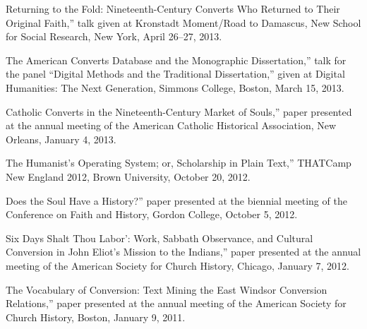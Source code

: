 \documentclass[11pt]{article}
\begin{document}
\noindent{}Returning to the Fold: Nineteenth-Century Converts Who Returned to Their Original Faith,'' talk given at Kronstadt Moment/Road to Damascus, New School for Social Research, New York, April 26--27, 2013.

\noindent{}The American Converts Database and the Monographic Dissertation,'' talk for the panel ``Digital Methods and the Traditional Dissertation,'' given at Digital Humanities: The Next Generation, Simmons College, Boston, March 15, 2013.

\noindent{}Catholic Converts in the Nineteenth-Century Market of Souls,'' paper presented at the annual meeting of the American Catholic Historical Association, New Orleans, January 4, 2013.

\noindent{}The Humanist's Operating System; or, Scholarship in Plain Text,'' THATCamp New England 2012, Brown University, October 20, 2012.

\noindent{}Does the Soul Have a History?'' paper presented at the biennial meeting of the Conference on Faith and History, Gordon College, October 5, 2012.

\noindent{}Six Days Shalt Thou Labor': Work, Sabbath Observance, and Cultural Conversion in John Eliot's Mission to the Indians,'' paper presented at the annual meeting of the American Society for Church History, Chicago, January 7, 2012.

\noindent{}The Vocabulary of Conversion: Text Mining the East Windsor Conversion Relations,'' paper presented at the annual meeting of the American Society for Church History, Boston, January 9, 2011.



% 
\end{document}
